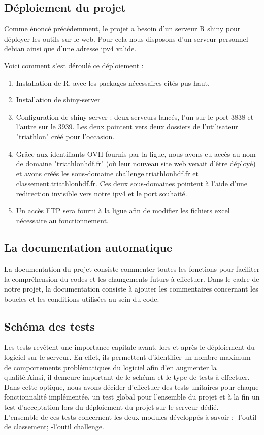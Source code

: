 \subsection {Déploiement du projet}

Comme énoncé précédemment, le projet a besoin d'un serveur R shiny pour déployer les outils sur le web.
Pour cela nous disposons d'un serveur personnel debian ainsi que d'une adresse ipv4 valide.

Voici comment s'est déroulé ce déploiement :

\begin{enumerate} 
	\item Installation de R, avec les packages nécessaires cités pus haut. \cite{ref2}
	\item Installation de shiny-server \cite{ref3}
	\item Configuration de shiny-server : deux serveurs lancés, l'un sur le port 3838 et l'autre sur le 3939. Les deux pointent vers deux dossiers de l'utilisateur "triathlon" créé pour l'occasion.
	\item Grâce aux identifiants OVH \cite{ref4} fournis par la ligue, nous avons eu accès au nom de domaine "triathlonhdf.fr" (où leur nouveau site web venait d'être déployé) et avons créés les sous-domaine challenge.triathlonhdf.fr et classement.triathlonhdf.fr. Ces deux sous-domaines pointent à l'aide d'une redirection invisible vers notre ipv4 et le port souhaité.
	\item Un accès FTP sera fourni à la ligue afin de modifier les fichiers excel nécessaire au fonctionnement.
\end{enumerate}


\subsection {La documentation automatique}
La documentation du projet consiste commenter toutes les fonctions pour faciliter la compréhension du codes et les changements futurs à effectuer.
Dans le cadre de notre projet,  la documentation  consiste à ajouter les commentaires concernant les boucles et les conditions utilisées au sein du code.


\subsection {Schéma des tests}
Les tests revêtent une importance capitale avant, lors et après le déploiement du logiciel sur le serveur. En effet, ils permettent d'identifier un nombre maximum de comportements problématiques du logiciel afin d'en augmenter la qualité.Ainsi, il demeure important de  le schéma et le type de tests à effectuer. \\
Dans cette optique, nous avons décider d'effectuer des tests unitaires pour chaque fonctionnalité implémentée, un test global pour l'ensemble du projet et à la fin un test d'acceptation lors du déploiement du projet sur le serveur dédié.\\
L'ensemble de ces tests concernent les deux modules développés à savoir :
-l'outil de classement; 
-l'outil challenge.

